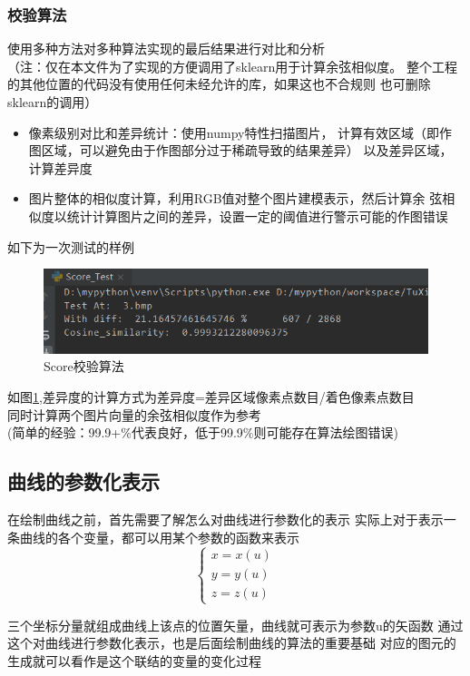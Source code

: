 \documentclass[a4paper,UTF8]{article}
\theoremstyle{definition}
\begin{document}
\subsubsection{校验算法}
使用多种方法对多种算法实现的最后结果进行对比和分析\\
（注：仅在本文件为了实现的方便调用了sklearn用于计算余弦相似度。
整个工程的其他位置的代码没有使用任何未经允许的库，如果这也不合规则
也可删除sklearn的调用）
\begin{itemize}
    \item 像素级别对比和差异统计：使用numpy特性扫描图片，
    计算有效区域（即作图区域，可以避免由于作图部分过于稀疏导致的结果差异）
    以及差异区域，计算差异度
    \item 图片整体的相似度计算，利用RGB值对整个图片建模表示，然后计算余
    弦相似度以统计计算图片之间的差异，设置一定的阈值进行警示可能的作图错误
\end{itemize}
如下为一次测试的样例\\

\begin{figure}[h]
	\centering
	\includegraphics[scale=0.6]{figure/test.png}
	\caption{Score校验算法}
	\label{fig:Score}
\end{figure}
如图\ref{fig:Score},差异度的计算方式为差异度=差异区域像素点数目/着色像素点数目\\
同时计算两个图片向量的余弦相似度作为参考\\
(简单的经验：99.9+\%代表良好，低于99.9\%则可能存在算法绘图错误)\\


\subsection{曲线的参数化表示}
在绘制曲线之前，首先需要了解怎么对曲线进行参数化的表示
实际上对于表示一条曲线的各个变量，都可以用某个参数的函数来表示
$$
\begin{cases}
    x=x(u)\\
    y=y(u)\\
    z=z(u)
\end{cases}
$$

三个坐标分量就组成曲线上该点的位置矢量，曲线就可表示为参数u的矢函数
通过这个对曲线进行参数化表示，也是后面绘制曲线的算法的重要基础
对应的图元的生成就可以看作是这个联结的变量的变化过程
\end{document}
